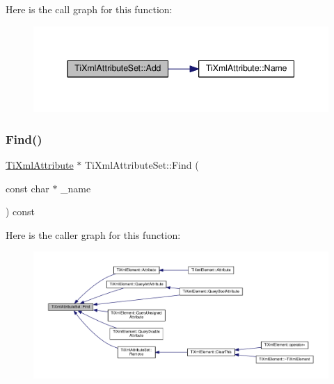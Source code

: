 Here is the call graph for this function\+:
\nopagebreak
\begin{figure}[H]
\begin{center}
\leavevmode
\includegraphics[width=344pt]{class_ti_xml_attribute_set_a745e50ddaae3bee93e4589321e0b9c1a_cgraph}
\end{center}
\end{figure}
\mbox{\label{class_ti_xml_attribute_set_a6d4f03bb84f70c78171db27a869225c1}} 
\subsubsection{\texorpdfstring{Find()}{Find()}}
{\footnotesize\ttfamily \hyperlink{class_ti_xml_attribute}{Ti\+Xml\+Attribute} $\ast$ Ti\+Xml\+Attribute\+Set\+::\+Find (\begin{DoxyParamCaption}\item[{const char $\ast$}]{\+\_\+name }\end{DoxyParamCaption}) const}

Here is the caller graph for this function\+:
\nopagebreak
\begin{figure}[H]
\begin{center}
\leavevmode
\includegraphics[width=350pt]{class_ti_xml_attribute_set_a6d4f03bb84f70c78171db27a869225c1_icgraph}
\end{center}
\end{figure}
\mbox{\label{class_ti_xml_attribute_set_a5e28f5d32f048fba85d04dc317495bdc}} 
